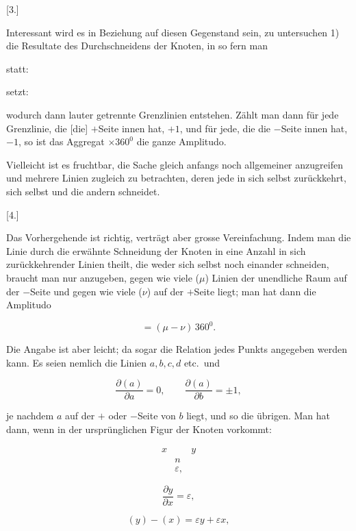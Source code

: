 %
\begin{center}[3.]\end{center}

Interessant wird es in Beziehung auf diesen Gegenstand sein, zu
untersuchen 1) die Resultate des Durchschneidens der Knoten, in so fern
man

\begin{center}
\begin{minipage}{5.7cm}\centering statt:\quad\end{minipage}
\begin{minipage}{5.7cm}\centering setzt:\quad\end{minipage}
\end{center}
\noindent wodurch dann lauter getrennte Grenzlinien entstehen. Zählt man dann für
jede Grenzlinie, die [die] $+$Seite innen hat, $+1$, und für
jede, die die $-$Seite innen hat, $-1$, so ist das Aggregat $\times 360^0$
die ganze Amplitudo. 

Vielleicht ist es fruchtbar, die Sache gleich anfangs noch allgemeiner
anzugreifen und mehrere Linien zugleich zu betrachten, deren jede in sich
selbst zurückkehrt, sich selbst und die andern
schneidet.

\begin{center}[4.]\end{center}

Das Vorhergehende ist richtig, verträgt aber grosse Vereinfachung. Indem
man die Linie durch die erwähnte Schneidung der Knoten in eine Anzahl in
sich zurückkehrender Linien theilt, die weder sich selbst noch einander
schneiden, braucht man nur anzugeben, gegen wie viele ($\mu$) Linien der
unendliche Raum auf der $-$Seite und gegen wie viele ($\nu$) auf der
$+$Seite liegt; man hat dann die Amplitudo

\[
= (\mu-\nu)\,360^0.
\]

Die Angabe ist aber leicht; da sogar die Relation jedes Punkts
angegeben werden kann. Es seien nemlich die Linien $a, b, c, d$
etc.\ und

\[
\frac{\partial(a)}{\partial a} = 0, \qquad \frac{\partial(a)}{\partial b} = \pm 1,
\]

je nachdem $a$ auf der $+$ oder $-$Seite von $b$ liegt, und so die
übrigen. Man hat dann, wenn in der ursprünglichen Figur der
Knoten vorkommt:

\[
\begin{array}{ccc}
x&&y \\
&n& \\
&\varepsilon,&
\end{array}
\]

\[
\frac{\partial y}{\partial x} = \varepsilon,
\]

\[
(y) - (x) = \varepsilon y + \varepsilon x,
\]
